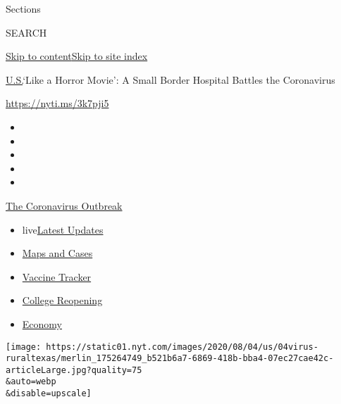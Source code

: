 Sections

SEARCH

\protect\hyperlink{site-content}{Skip to
content}\protect\hyperlink{site-index}{Skip to site index}

\href{/section/us}{U.S.}\textbar{}`Like a Horror Movie': A Small Border
Hospital Battles the Coronavirus

\url{https://nyti.ms/3k7pji5}

\begin{itemize}
\item
\item
\item
\item
\item
\end{itemize}

\href{https://www.nytimes.com/news-event/coronavirus?action=click\&pgtype=Article\&state=default\&region=TOP_BANNER\&context=storylines_menu}{The
Coronavirus Outbreak}

\begin{itemize}
\tightlist
\item
  live\href{https://www.nytimes.com/2020/08/04/world/coronavirus-cases.html?action=click\&pgtype=Article\&state=default\&region=TOP_BANNER\&context=storylines_menu}{Latest
  Updates}
\item
  \href{https://www.nytimes.com/interactive/2020/us/coronavirus-us-cases.html?action=click\&pgtype=Article\&state=default\&region=TOP_BANNER\&context=storylines_menu}{Maps
  and Cases}
\item
  \href{https://www.nytimes.com/interactive/2020/science/coronavirus-vaccine-tracker.html?action=click\&pgtype=Article\&state=default\&region=TOP_BANNER\&context=storylines_menu}{Vaccine
  Tracker}
\item
  \href{https://www.nytimes.com/2020/08/02/us/covid-college-reopening.html?action=click\&pgtype=Article\&state=default\&region=TOP_BANNER\&context=storylines_menu}{College
  Reopening}
\item
  \href{https://www.nytimes.com/live/2020/08/04/business/stock-market-today-coronavirus?action=click\&pgtype=Article\&state=default\&region=TOP_BANNER\&context=storylines_menu}{Economy}
\end{itemize}

\texttt{[image: https://static01.nyt.com/images/2020/08/04/us/04virus-ruraltexas/merlin\_175264749\_b521b6a7-6869-418b-bba4-07ec27cae42c-articleLarge.jpg?quality=75\\\&auto=webp\\\&disable=upscale]}

